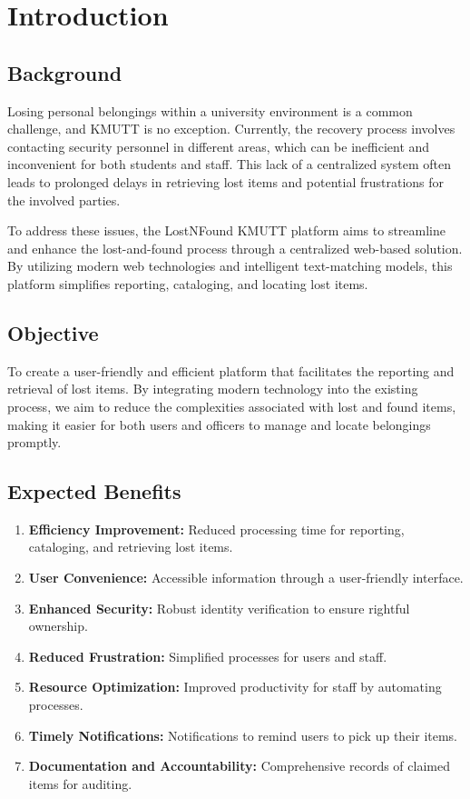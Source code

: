 \chapter{Introduction}

\section{Background}
Losing personal belongings within a university environment is a common challenge, and KMUTT is no exception. Currently, the recovery process involves contacting security personnel in different areas, which can be inefficient and inconvenient for both students and staff. This lack of a centralized system often leads to prolonged delays in retrieving lost items and potential frustrations for the involved parties.

To address these issues, the LostNFound KMUTT platform aims to streamline and enhance the lost-and-found process through a centralized web-based solution. By utilizing modern web technologies and intelligent text-matching models, this platform simplifies reporting, cataloging, and locating lost items.

\section{Objective}
To create a user-friendly and efficient platform that facilitates the reporting and retrieval of lost items. By integrating modern technology into the existing process, we aim to reduce the complexities associated with lost and found items, making it easier for both users and officers to manage and locate belongings promptly.

\section{Expected Benefits}
\begin{enumerate}
    \item \textbf{Efficiency Improvement:} Reduced processing time for reporting, cataloging, and retrieving lost items.
    \item \textbf{User Convenience:} Accessible information through a user-friendly interface.
    \item \textbf{Enhanced Security:} Robust identity verification to ensure rightful ownership.
    \item \textbf{Reduced Frustration:} Simplified processes for users and staff.
    \item \textbf{Resource Optimization:} Improved productivity for staff by automating processes.
    \item \textbf{Timely Notifications:} Notifications to remind users to pick up their items.
    \item \textbf{Documentation and Accountability:} Comprehensive records of claimed items for auditing.
\end{enumerate}

